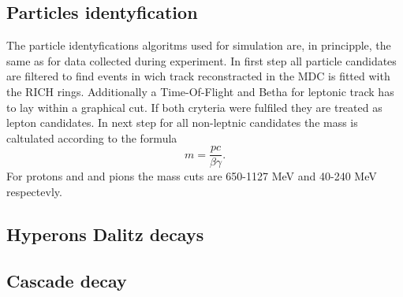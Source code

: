 \subsection{Particles identyfication}
\label{chapter:simulation_identyfication}
The particle identyfications algoritms used for simulation are, in principple, the same as for data collected during experiment. In first step all particle candidates are filtered to find events in wich track reconstracted in the MDC is fitted with the RICH rings. Additionally a Time-Of-Flight and Betha for leptonic track has to lay within a graphical cut. If both cryteria were fulfiled they are treated as lepton candidates. In next step for all non-leptnic candidates the mass is caltulated according to the formula
\begin{equation}
  m=\frac{pc}{\beta \gamma}.
\end{equation}
For protons and and pions the mass cuts are 650-1127 MeV and 40-240 MeV respectevly. 
\subsection{Hyperons Dalitz decays}

\subsection{Cascade decay}
\label{section:results}